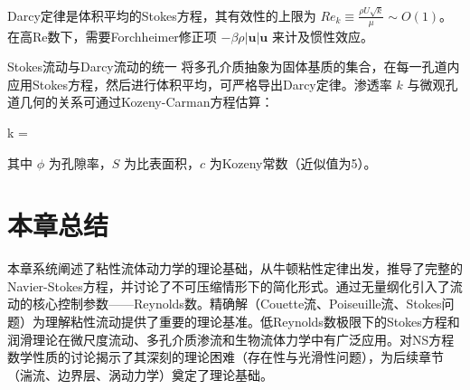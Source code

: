 Darcy定律是体积平均的Stokes方程，其有效性的上限为 $Re_k \equiv \frac{\rho U\sqrt{k}}{\mu} \sim O(1)$。在高Re数下，需要Forchheimer修正项 $-\beta\rho|\mathbf{u}|\mathbf{u}$ 来计及惯性效应。

\begin{myTheorem}{Stokes流动与Darcy流动的统一}
将多孔介质抽象为固体基质的集合，在每一孔道内应用Stokes方程，然后进行体积平均，可严格导出Darcy定律。渗透率 $k$ 与微观孔道几何的关系可通过Kozeny-Carman方程估算：
\begin{myformula}
    k = 
\end{myformula}
其中 $\phi$ 为孔隙率，$S$ 为比表面积，$c$ 为Kozeny常数（近似值为5）。
\end{myTheorem}

\section{本章总结}

本章系统阐述了粘性流体动力学的理论基础，从牛顿粘性定律出发，推导了完整的Navier-Stokes方程，并讨论了不可压缩情形下的简化形式。通过无量纲化引入了流动的核心控制参数——Reynolds数。精确解（Couette流、Poiseuille流、Stokes问题）为理解粘性流动提供了重要的理论基准。低Reynolds数极限下的Stokes方程和润滑理论在微尺度流动、多孔介质渗流和生物流体力学中有广泛应用。对NS方程数学性质的讨论揭示了其深刻的理论困难（存在性与光滑性问题），为后续章节（湍流、边界层、涡动力学）奠定了理论基础。
